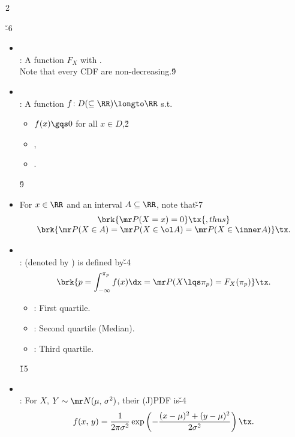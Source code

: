 \documentclass[dvipdfmx,a4paper,titlepage,9pt]{jsarticle}
\begin{document}
\begin{multicols*}{2}
\newpage
{}

\v{-6}
\begin{itemize}[label={-}]
\item{}\\
: A function $F_X$ with .\\
\;\;Note that every CDF are non-decreasing.\v9

\item{}\\
: A function $f\!: D(\subseteq\RR)\longto\RR$ s.t.
\begin{itemize}[label=\Cdot]
\item $f(x)\gqs 0$ for all $x\in D$,\v2
\item {},
\item {}.
\end{itemize}\v9

\item For $x\in\RR$ and an interval $A\subseteq\RR$, note that\v{-7}
$$\begin{array}{c}\brk{\mr P(X=x)=0}\tx{, thus}\\
\brk{\mr P(X\in A)=\mr P(X\in\ol A)=\mr P(X\in\inner A)}\tx.
\end{array}$$

\item{}\\
:  (denoted by ) is defined by\v{-4}
$$\brk{p=\int_{-\infty}^{\pi_p} f(x)\dx=\mr P(X\lqs \pi_p)=F_X(\pi_p)}\tx.$$

\begin{itemize}[label=\Cdot]
\item {}: First quartile.
\item {}: Second quartile (Median).
\item {}: Third quartile.
\end{itemize}\v{15}

\item{}\\
: For $X$, $Y\sim \mr N(\mu,\,\sigma^2)$, their (J)PDF is\v{-4}
$$f(x,\,y)=\frac1{2\pi\sigma^2}\exp\left(-\frac{(x-\mu)^2+(y-\mu)^2}{2\sigma^2}\right)\tx.$$


\end{itemize}
\end{multicols*}
\end{document}
